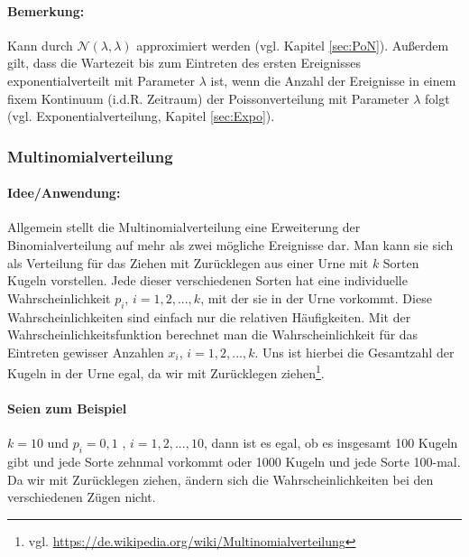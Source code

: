 \documentclass[a4paper]{article}
\begin{document}
\paragraph{Bemerkung:} Kann durch $\mathcal{N}(\lambda,\lambda)$ approximiert werden (vgl. Kapitel \ref{sec:PoN}). Außerdem gilt, dass die Wartezeit bis zum Eintreten des ersten Ereignisses exponentialverteilt mit Parameter $\lambda$ ist, wenn die Anzahl der Ereignisse in einem fixem Kontinuum (i.d.R. Zeitraum) der Poissonverteilung mit Parameter $\lambda$ folgt (vgl. Exponentialverteilung, Kapitel \ref{sec:Expo}). \\

\noindent {}

\subsubsection{Multinomialverteilung} \label{sec:Multi}

\paragraph{Idee/Anwendung:} Allgemein stellt die Multinomialverteilung eine Erweiterung der Binomialverteilung auf mehr als zwei mögliche Ereignisse dar. Man kann sie sich als Verteilung für das Ziehen mit Zurücklegen aus einer Urne mit $k$ Sorten Kugeln vorstellen. Jede dieser verschiedenen Sorten hat eine individuelle Wahrscheinlichkeit $p_i$, $i=1,2,...,k$, mit der sie in der Urne vorkommt. Diese Wahrscheinlichkeiten sind einfach nur die relativen Häufigkeiten. Mit der Wahrscheinlichkeitsfunktion berechnet man die Wahrscheinlichkeit für das Eintreten gewisser Anzahlen $x_i$, $i=1,2,...,k$. Uns ist hierbei die Gesamtzahl der Kugeln in der Urne egal, da wir mit Zurücklegen ziehen\footnote{vgl. \url{https://de.wikipedia.org/wiki/Multinomialverteilung}}. 

\paragraph{Seien zum Beispiel} $k=10$ und $p_i=0,1$ , $i=1,2,...,10$, dann ist es egal, ob es insgesamt 100 Kugeln gibt und jede Sorte zehnmal vorkommt oder 1000 Kugeln und jede Sorte 100-mal. Da wir mit Zurücklegen ziehen, ändern sich die Wahrscheinlichkeiten bei den verschiedenen Zügen nicht.
\end{document}
